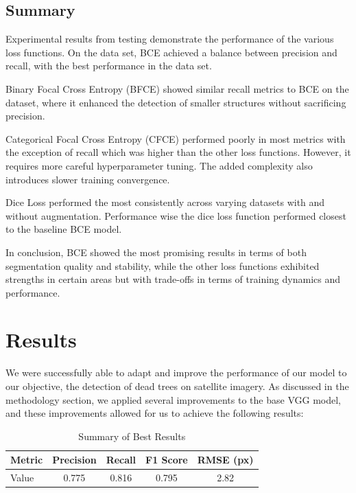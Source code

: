 \documentclass[conference]{ieeetran}
\begin{document}
\subsection*{Summary}

Experimental results from testing demonstrate the performance of the various loss functions. On the data set, BCE achieved a balance between precision and recall, with the best performance in the data set.

Binary Focal Cross Entropy (BFCE) showed similar recall metrics to BCE on the dataset, where it enhanced the detection of smaller structures without sacrificing precision.

Categorical Focal Cross Entropy (CFCE) performed poorly in most metrics with the exception of recall which was higher than the other loss functions. However, it requires more careful hyperparameter tuning. The added complexity also introduces slower training convergence.

Dice Loss performed the most consistently across varying datasets with and without augmentation. Performance wise the dice loss function performed closest to the baseline BCE model. 

In conclusion, BCE showed the most promising results in terms of both segmentation quality and stability, while the other loss functions exhibited strengths in certain areas but with trade-offs in terms of training dynamics and performance. 

 
\section{Results}

We were successfully able to adapt and improve the performance of our model to our objective, the detection of dead trees on satellite imagery. As discussed in the methodology section, we applied several improvements to the base VGG model, and these improvements allowed for us to achieve the following results:

\begin{table}[h]
\centering
\caption{Summary of Best Results}
\label{tab:dice_full}
\begin{tabular}{lcccc}
\toprule
Metric & Precision & Recall & F1 Score & RMSE (px) \\
\midrule
Value  & 0.775 & 0.816 & 0.795 & 2.82 \\
\bottomrule
\end{tabular}
\end{table}
\end{document}
